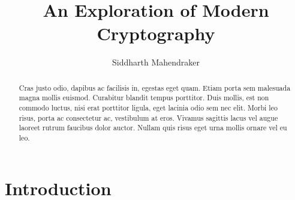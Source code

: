 \documentclass[12pt, a4paper, draft]{report}
\begin{document}
\title{An Exploration of Modern Cryptography}
\author{Siddharth Mahendraker}
\maketitle

\begin{abstract}
Cras justo odio, dapibus ac facilisis in,
egestas eget quam. Etiam porta sem malesuada magna mollis euismod.
Curabitur blandit tempus porttitor. Duis mollis, est non commodo
luctus, nisi erat porttitor ligula, eget lacinia odio sem nec
elit. Morbi leo risus, porta ac consectetur ac, vestibulum at eros.
Vivamus sagittis lacus vel augue laoreet rutrum faucibus dolor auctor.
Nullam quis risus eget urna mollis ornare vel eu leo.
\end{abstract}

\setcounter{page}{1}
\tableofcontents
\clearpage

\section*{Introduction}
\setcounter{page}{1}
\end{document}
